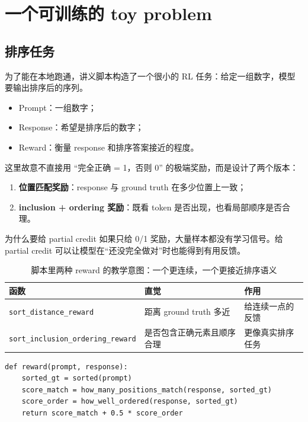 \section{一个可训练的 toy problem}

\subsection{排序任务}

为了能在本地跑通，讲义脚本构造了一个很小的 RL 任务：给定一组数字，模型要输出排序后的序列。

\begin{itemize}
    \item Prompt：一组数字；
    \item Response：希望是排序后的数字；
    \item Reward：衡量 response 和排序答案接近的程度。
\end{itemize}

这里故意不直接用 “完全正确 = 1，否则 0” 的极端奖励，而是设计了两个版本：
\begin{enumerate}
    \item \textbf{位置匹配奖励}：response 与 ground truth 在多少位置上一致；
    \item \textbf{inclusion + ordering 奖励}：既看 token 是否出现，也看局部顺序是否合理。
\end{enumerate}

\begin{importantbox}{为什么要给 partial credit}
如果只给 0/1 奖励，大量样本都没有学习信号。给 partial credit 可以让模型在“还没完全做对”时也能得到有用反馈。
\end{importantbox}


\begin{table}[H]
\centering
\begin{tabular}{@{}lll@{}}
\toprule
\textbf{函数} & \textbf{直觉} & \textbf{作用} \\
\midrule
\texttt{sort\_distance\_reward} & 距离 ground truth 多近 & 给连续一点的反馈 \\
\texttt{sort\_inclusion\_ordering\_reward} & 是否包含正确元素且顺序合理 & 更像真实排序任务 \\
\bottomrule
\end{tabular}
\caption{脚本里两种 reward 的教学意图：一个更连续，一个更接近排序语义}
\end{table}

\begin{lstlisting}[caption={toy reward pseudocode}]
def reward(prompt, response):
    sorted_gt = sorted(prompt)
    score_match = how_many_positions_match(response, sorted_gt)
    score_order = how_well_ordered(response, sorted_gt)
    return score_match + 0.5 * score_order
\end{lstlisting}

